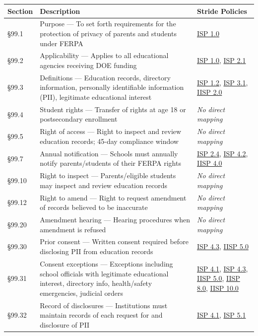\documentclass[11pt,landscape]{article}
\begin{document}
\begin{longtable}{|p{2cm}|p{4.5in}|p{3in}|}
\hline
\rowcolor{headgray} \textbf{Section} & \textbf{Description} & \textbf{Stride Policies} \\
\hline
\endhead
§99.1 & Purpose --- To set forth requirements for the protection of privacy of parents and students under FERPA & \hyperref[pol:ISP10]{ISP 1.0} \\
\hline
§99.2 & Applicability --- Applies to all educational agencies receiving DOE funding & \hyperref[pol:ISP10]{ISP 1.0}, \hyperref[pol:ISP21]{ISP 2.1} \\
\hline
§99.3 & Definitions --- Education records, directory information, personally identifiable information (PII), legitimate educational interest & \hyperref[pol:ISP12]{ISP 1.2}, \hyperref[pol:ISP31]{ISP 3.1}, \hyperref[pol:IISP20]{IISP 2.0} \\
\hline
§99.4 & Student rights --- Transfer of rights at age 18 or postsecondary enrollment & \textit{No direct mapping} \\
\hline
§99.5 & Right of access --- Right to inspect and review education records; 45-day compliance window & \textit{No direct mapping} \\
\hline
§99.7 & Annual notification --- Schools must annually notify parents/students of their FERPA rights & \hyperref[pol:ISP24]{ISP 2.4}, \hyperref[pol:ISP42]{ISP 4.2}, \hyperref[pol:IISP40]{IISP 4.0} \\
\hline
§99.10 & Right to inspect --- Parents/eligible students may inspect and review education records & \textit{No direct mapping} \\
\hline
§99.12 & Right to amend --- Right to request amendment of records believed to be inaccurate & \textit{No direct mapping} \\
\hline
§99.20 & Amendment hearing --- Hearing procedures when amendment is refused & \textit{No direct mapping} \\
\hline
§99.30 & Prior consent --- Written consent required before disclosing PII from education records & \hyperref[pol:ISP43]{ISP 4.3}, \hyperref[pol:IISP50]{IISP 5.0} \\
\hline
§99.31 & Consent exceptions --- Exceptions including school officials with legitimate educational interest, directory info, health/safety emergencies, judicial orders & \hyperref[pol:ISP41]{ISP 4.1}, \hyperref[pol:ISP43]{ISP 4.3}, \hyperref[pol:IISP50]{IISP 5.0}, \hyperref[pol:IISP80]{IISP 8.0}, \hyperref[pol:IISP100]{IISP 10.0} \\
\hline
§99.32 & Record of disclosures --- Institutions must maintain records of each request for and disclosure of PII & \hyperref[pol:ISP41]{ISP 4.1}, \hyperref[pol:ISP51]{ISP 5.1} \\

\end{longtable}
\end{document}
